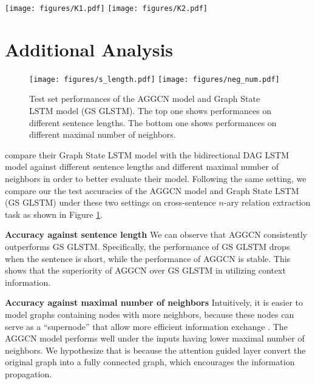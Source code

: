 \documentclass[11pt,a4paper]{article}
\begin{document}
\begin{figure*}
    \centering
    \texttt{[image: figures/K1.pdf]}
    \texttt{[image: figures/K2.pdf]}
    \vspace{-2mm}
    \caption{Example dependency trees for two sentences expressing a relation (sensitivity) among three entities \textit{L858E}, \textit{EGFR} and \textit{gefitinib}. The top one shows the pruned tree when $K$=0 (highlighted in bold). The bottom one shows the pruned tree when $K$=1 (highlighted in bold). Tokens \textit{partial response} are off these two paths.}
\label{fig:Figure6}
\end{figure*}

\section{Additional Analysis}
\label{sec:7}

\begin{figure}
    \centering
    \texttt{[image: figures/s\_length.pdf]}
    \texttt{[image: figures/neg\_num.pdf]}
    \caption{Test set performances of the AGGCN model and Graph State LSTM model (GS GLSTM). The top one shows performances on different sentence lengths. The bottom one shows performances on different maximal number of neighbors.}
    \label{fig:Figure7}
\end{figure}
\noindent
\citet{Song2018NaryRE} compare their Graph State LSTM model with the bidirectional DAG LSTM model against different sentence lengths and different maximal number of neighbors in order to better evaluate their model. Following the same setting, we compare our the test accuracies of the AGGCN model and Graph State LSTM  (GS GLSTM) under these two settings on cross-sentence $n$-ary relation extraction task as shown in Figure \ref{fig:Figure7}.

\textbf{Accuracy against sentence length}
We can observe that AGGCN consistently outperforms GS GLSTM. Specifically, the performance of GS GLSTM drops when the sentence is short, while the performance of AGGCN is stable. This shows that the superiority of AGGCN over GS GLSTM in utilizing context information.

\textbf{Accuracy against maximal number of neighbors}
Intuitively, it is easier to model graphs containing nodes with more neighbors, because these nodes can serve as a ``supernode'' that allow more efficient information exchange \citep{Song2018NaryRE}. The AGGCN model performs well under the inputs having lower maximal number of neighbors. We hypothesize that is because the attention guided layer convert the original graph into a fully connected graph, which encourages the information propagation.   
\end{document}
